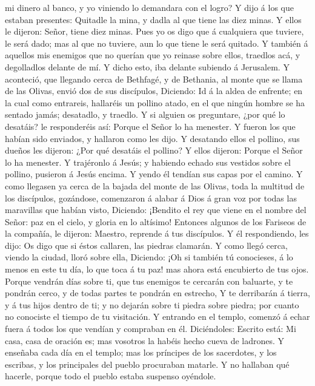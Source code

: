 mi dinero al banco, y yo viniendo lo demandara con el logro?
 Y dijo á los que estaban presentes: Quitadle la mina, y
dadla al que tiene las diez minas.  Y ellos le dijeron:
Señor, tiene diez minas.  Pues yo os digo que á
cualquiera que tuviere, le será dado; mas al que no tuviere, aun lo que
tiene le será quitado.  Y también á aquellos mis enemigos
que no querían que yo reinase sobre ellos, traedlos acá, y degolladlos
delante de mí.  Y dicho esto, iba delante subiendo á
Jerusalem.  Y aconteció, que llegando cerca de Bethfagé,
y de Bethania, al monte que se llama de las Olivas, envió dos de sus
discípulos,  Diciendo: Id á la aldea de enfrente; en la
cual como entrareis, hallaréis un pollino atado, en el que ningún hombre
se ha sentado jamás; desatadlo, y traedlo.  Y si alguien
os preguntare, ¿por qué lo desatáis? le responderéis así: Porque el
Señor lo ha menester.  Y fueron los que habían sido
enviados, y hallaron como les dijo.  Y desatando ellos el
pollino, sus dueños les dijeron: ¿Por qué desatáis el pollino?
 Y ellos dijeron: Porque el Señor lo ha menester.
 Y trajéronlo á Jesús; y habiendo echado sus vestidos
sobre el pollino, pusieron á Jesús encima.  Y yendo él
tendían sus capas por el camino.  Y como llegasen ya
cerca de la bajada del monte de las Olivas, toda la multitud de los
discípulos, gozándose, comenzaron á alabar á Dios á gran voz por todas
las maravillas que habían visto,  Diciendo: ¡Bendito el
rey que viene en el nombre del Señor: paz en el cielo, y gloria en lo
altísimo!  Entonces algunos de los Fariseos de la
compañía, le dijeron: Maestro, reprende á tus discípulos.
 Y él respondiendo, les dijo: Os digo que si éstos
callaren, las piedras clamarán.  Y como llegó cerca,
viendo la ciudad, lloró sobre ella,  Diciendo: ¡Oh si
también tú conocieses, á lo menos en este tu día, lo que toca á tu paz!
mas ahora está encubierto de tus ojos.  Porque vendrán
días sobre ti, que tus enemigos te cercarán con baluarte, y te pondrán
cerco, y de todas partes te pondrán en estrecho,  Y te
derribarán á tierra, y á tus hijos dentro de ti; y no dejarán sobre ti
piedra sobre piedra; por cuanto no conociste el tiempo de tu visitación.
 Y entrando en el templo, comenzó á echar fuera á todos
los que vendían y compraban en él.  Diciéndoles: Escrito
está: Mi casa, casa de oración es; mas vosotros la habéis hecho cueva de
ladrones.  Y enseñaba cada día en el templo; mas los
príncipes de los sacerdotes, y los escribas, y los principales del
pueblo procuraban matarle.  Y no hallaban qué hacerle,
porque todo el pueblo estaba suspenso oyéndole.

